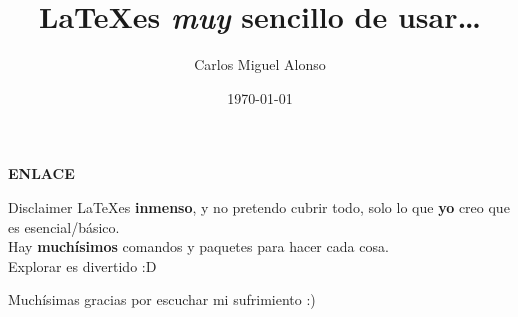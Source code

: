 \documentclass[12pt, spanish]{beamer}
\title{\LaTeX es \textit{muy} sencillo de usar\ldots{}}
\author[CMA]{Carlos Miguel Alonso}
\institute{ACM UPM}
\date{\today}
\begin{document}
\begin{frame}
   \thispagestyle{empty}
   \titlepage
\end{frame}

\begin{frame}
    \centering
    {\Large \textbf{ENLACE}}
\end{frame}

\begin{frame}
    \centering
    \begin{alertblock}{Disclaimer}
        \LaTeX es \textbf{inmenso}, y no pretendo cubrir todo, solo lo que \textbf{yo} creo que es esencial/básico.\\
        Hay \textbf{muchísimos} comandos y paquetes para hacer cada cosa.\\
        Explorar es divertido :D 
    \end{alertblock}
\end{frame}














\begin{frame}
    \centering
    Muchísimas gracias por escuchar mi sufrimiento :)
\end{frame}
\end{document}
